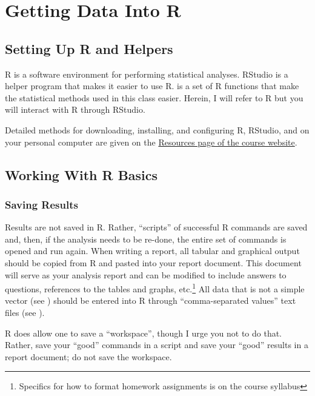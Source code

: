 \documentclass[10pt,openany]{book}\usepackage[]{graphicx}\usepackage[]{color}
\begin{document}
\chapter{Getting Data Into R} \label{chap:FoundationsR}

\vspace{-12pt}
\minitoc

\section{Setting Up R and Helpers} \label{sect:RSetup}
\vspace{-4pt}
R is a software environment for performing statistical analyses. RStudio is a helper program that makes it easier to use R.  is a set of R functions that make the statistical methods used in this class easier. Herein, I will refer to R but you will interact with R through RStudio.

Detailed methods for downloading, installing, and configuring R, RStudio, and  on your personal computer are given on the \href{http://derekogle.com/NCMTH107/resources#computer}{Resources page of the course website}.

\section{Working With R Basics} \label{sect:RBasics}
\vspace{-4pt}
\subsection{Saving Results} \label{sect:RSaving}
\vspace{-4pt}
Results are not saved in R. Rather, ``scripts'' of successful R commands are saved and, then, if the analysis needs to be re-done, the entire set of commands is opened and run again. When writing a report, all tabular and graphical output should be copied from R and pasted into your report document. This document will serve as your analysis report and can be modified to include answers to questions, references to the tables and graphs, etc.\footnote{Specifics for how to format homework assignments is on the course syllabus}  All data that is not a simple vector (see ) should be entered into R through ``comma-separated values'' text files (see ).

R does allow one to save a ``workspace'', though I urge you not to do that. Rather, save your ``good'' commands in a script and save your ``good'' results in a report document; do not save the workspace.
\end{document}
